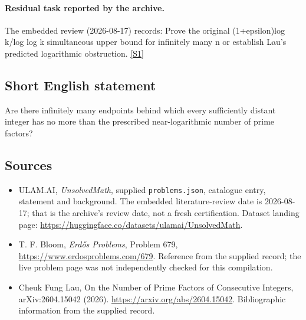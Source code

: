 \documentclass[11pt,a4paper]{article}
\newcommand{\sref}[2]{\hyperlink{source:#1:#2}{[S#2]}}
\begin{document}
\paragraph{Residual task reported by the archive.}

The embedded review (2026-08-17) records: Prove the original (1+epsilon)log k/log log k simultaneous upper bound for infinitely many n or establish Lau's predicted logarithmic obstruction. \sref{statement}{1}

\subsection{Short English statement}

Are there infinitely many endpoints behind which every sufficiently distant integer has no more than the prescribed near-logarithmic number of prime factors?

\subsection{Sources}

{\small

\begin{itemize}

\item[\hypertarget{source:statement:1}{S1}] ULAM.AI, \emph{UnsolvedMath}, supplied \texttt{problems.json}, catalogue entry, statement and background. The embedded literature-review date is 2026-08-17; that is the archive’s review date, not a fresh certification. Dataset landing page: \url{https://huggingface.co/datasets/ulamai/UnsolvedMath}.

\item[\hypertarget{source:statement:2}{S2}] T. F. Bloom, \emph{Erdős Problems}, Problem 679, \url{https://www.erdosproblems.com/679}. Reference from the supplied record; the live problem page was not independently checked for this compilation.

\item[\hypertarget{source:statement:3}{S3}] Cheuk Fung Lau, On the Number of Prime Factors of Consecutive Integers, arXiv:2604.15042 (2026). \url{https://arxiv.org/abs/2604.15042}. Bibliographic information from the supplied record.

\end{itemize}

}

\label{end:statement}
\end{document}
